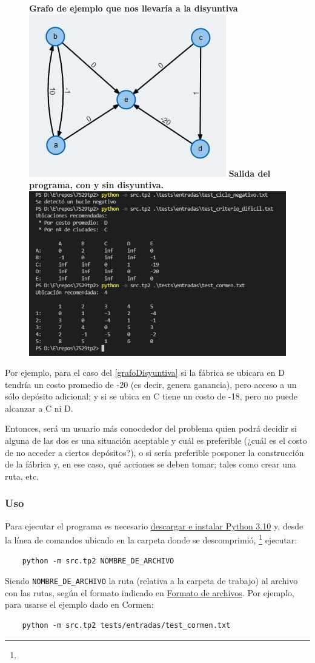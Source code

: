 \documentclass[../tp2_grupo404.tex]{subfiles}
\begin{document}
\begin{figure}[H]
    \centering
    \subcaptionbox
        {\label{grafoDisyuntiva}\textbf{Grafo de ejemplo que nos llevaría a la disyuntiva}}
        {\includegraphics[width=0.4\linewidth,angle=0,origin=c]{img/disyuntiva.jpg}}
    \subcaptionbox
        {\label{outDisyuntiva}\textbf{Salida del programa, con y sin disyuntiva.}}
        {\includegraphics[width=0.4\linewidth,angle=0,origin=c]{img/salida.png}}
\end{figure}

Por ejemplo, para el caso del \cref{grafoDisyuntiva} si la fábrica se ubicara en
D tendría un costo promedio de -20 (es decir, genera ganancia), pero acceso a un sólo
depósito adicional; y si se ubica en C tiene un costo de -18, pero no puede alcanzar
a C ni D.

Entonces, será un usuario más conocdedor del problema quien podrá decidir si alguna de
las dos es una situación aceptable y cuál es preferible (¿cuál es el costo de no acceder
a ciertos depósitos?), o si sería preferible posponer la construcción de la fábrica y,
en ese caso, qué acciones se deben tomar; tales como crear una ruta, etc.

\subsubsection{Uso}
Para ejecutar el programa es necesario
\href{https://www.python.org/downloads/}{descargar e instalar Python 3.10}
y, desde la línea de comandos ubicado en la carpeta donde se descomprimió,
\footnote{}
ejecutar:
\begin{verbatim}
    python -m src.tp2 NOMBRE_DE_ARCHIVO
\end{verbatim}
Siendo \texttt{NOMBRE\_DE\_ARCHIVO} la ruta (relativa a la carpeta de trabajo)
al archivo con las rutas, según el formato indicado en
\hyperref[enuncFormatoArchivos]{Formato de archivos}.
Por ejemplo, para usarse el ejemplo dado en Cormen:
\begin{verbatim}
    python -m src.tp2 tests/entradas/test_cormen.txt
\end{verbatim}
\end{document}
